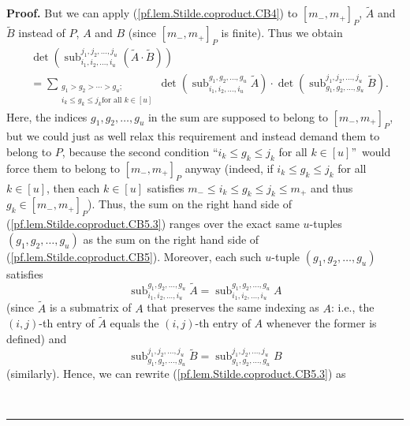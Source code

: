 \documentclass[numbers=enddot,12pt,final,onecolumn,notitlepage]{scrartcl}%
\numberwithin{exer}{section}
\theoremstyle{definition}
\newenvironment{proof}[1][Proof]{\noindent\textbf{#1.} }{\ \rule{0.5em}{0.5em}}
\let\sumnonlimits\sum
\renewcommand{\sum}{\sumnonlimits\limits}
\theoremstyle{plainsl}
\begin{document}
\begin{proof}
But we can apply (\ref{pf.lem.Stilde.coproduct.CB4}) to $\left[  m_{-}%
,m_{+}\right]  _{P}$, $\widetilde{A}$ and $\widetilde{B}$ instead of $P$, $A$
and $B$ (since $\left[  m_{-},m_{+}\right]  _{P}$ is finite). Thus we obtain%
\begin{align}
&  \det\left(  \operatorname*{sub}\nolimits_{i_{1},i_{2},\ldots,i_{u}}%
^{j_{1},j_{2},\ldots,j_{u}}\left(  \widetilde{A}\cdot\widetilde{B}\right)
\right) \nonumber\\
&  =\sum_{\substack{g_{1}>g_{2}>\cdots>g_{u};\\i_{k}\leq g_{k}\leq j_{k}\text{
for all }k\in\left[  u\right]  }}\det\left(  \operatorname*{sub}%
\nolimits_{i_{1},i_{2},\ldots,i_{u}}^{g_{1},g_{2},\ldots,g_{u}}\widetilde{A}%
\right)  \cdot\det\left(  \operatorname*{sub}\nolimits_{g_{1},g_{2}%
,\ldots,g_{u}}^{j_{1},j_{2},\ldots,j_{u}}\widetilde{B}\right)  .
\label{pf.lem.Stilde.coproduct.CB5.3}%
\end{align}
Here, the indices $g_{1},g_{2},\ldots,g_{u}$ in the sum are supposed to belong
to $\left[  m_{-},m_{+}\right]  _{P}$, but we could just as well relax this
requirement and instead demand them to belong to $P$, because the second
condition \textquotedblleft$i_{k}\leq g_{k}\leq j_{k}$ for all $k\in\left[
u\right]  $\textquotedblright\ would force them to belong to $\left[
m_{-},m_{+}\right]  _{P}$ anyway (indeed, if $i_{k}\leq g_{k}\leq j_{k}$ for
all $k\in\left[  u\right]  $, then each $k\in\left[  u\right]  $ satisfies
$m_{-}\leq i_{k}\leq g_{k}\leq j_{k}\leq m_{+}$ and thus $g_{k}\in\left[
m_{-},m_{+}\right]  _{P}$). Thus, the sum on the right hand side of
(\ref{pf.lem.Stilde.coproduct.CB5.3}) ranges over the exact same $u$-tuples
$\left(  g_{1},g_{2},\ldots,g_{u}\right)  $ as the sum on the right hand side
of (\ref{pf.lem.Stilde.coproduct.CB5}). Moreover, each such $u$-tuple $\left(
g_{1},g_{2},\ldots,g_{u}\right)  $ satisfies
\[
\operatorname*{sub}\nolimits_{i_{1},i_{2},\ldots,i_{u}}^{g_{1},g_{2}%
,\ldots,g_{u}}\widetilde{A}=\operatorname*{sub}\nolimits_{i_{1},i_{2}%
,\ldots,i_{u}}^{g_{1},g_{2},\ldots,g_{u}}A
\]
(since $\widetilde{A}$ is a submatrix of $A$ that preserves the same indexing
as $A$: i.e., the $\left(  i,j\right)  $-th entry of $\widetilde{A}$ equals
the $\left(  i,j\right)  $-th entry of $A$ whenever the former is defined)
and
\[
\operatorname*{sub}\nolimits_{g_{1},g_{2},\ldots,g_{u}}^{j_{1},j_{2}%
,\ldots,j_{u}}\widetilde{B}=\operatorname*{sub}\nolimits_{g_{1},g_{2}%
,\ldots,g_{u}}^{j_{1},j_{2},\ldots,j_{u}}B
\]
(similarly). Hence, we can rewrite (\ref{pf.lem.Stilde.coproduct.CB5.3}) as%

\end{proof}
\end{document}
